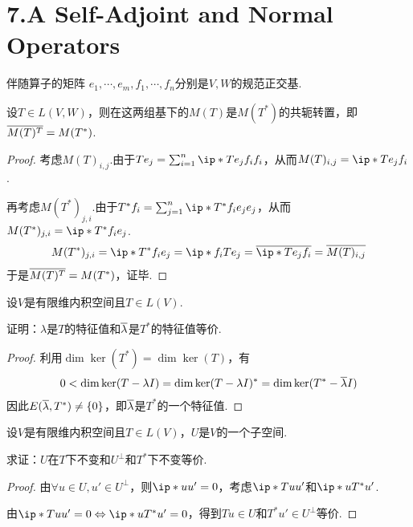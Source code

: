 \section{7.A Self-Adjoint and Normal Operators}

\begin{theorem}[7.10]\label{thm 7.10} 伴随算子的矩阵 \:
    \(e_1,\cdots,e_m,f_1,\cdots,f_n\)分别是\(V,W\)的规范正交基.

    设\(T \in L(V,W)\)，则在这两组基下的\(M(T)\)是\(M(T^*)\)的共轭转置，即\(\overline{M(T)^T}=M(T^*)\).
\end{theorem}

\begin{proof}
    考虑\(M(T)_{i,j}\).由于\(Te_j=\sum_{i=1}^n \ip*{Te_j}{f_i}f_i\)，从而\(M(T)_{i,j}=\ip*{Te_j}{f_i}\).

    再考虑\(M(T^*)_{j,i}\).由于\(T^*f_i=\sum_{j=1}^n \ip*{T^*f_i}{e_j}e_j\)，从而\(M(T^*)_{j,i}=\ip*{T^*f_i}{e_j}\).
    \begin{align*}
        M(T^*)_{j,i}=\ip*{T^*f_i}{e_j}=\ip*{f_i}{Te_j}=\ol{\ip*{Te_j}{f_i}}=\ol{M(T)_{i,j}}
    \end{align*}
    于是\(\overline{M(T)^T}=M(T^*)\)，证毕.
\end{proof}

\begin{problem}[2]\label{7.A.2}
    设\(V\)是有限维内积空间且\(T \in L(V)\).

    证明：\(\lambda\)是\(T\)的特征值和\(\overline{\lambda}\)是\(T^*\)的特征值等价.
\end{problem}

\begin{proof}
    利用\(\dim \ker(T^*)=\dim \ker(T)\)，有
    \begin{align*}
        0<\dim \ker(T-\lambda I)=\dim \ker(T-\lambda I)^*=\dim \ker(T^*-\overline{\lambda}I)
    \end{align*}
因此\(E(\overline{\lambda},T^*) \ne \{0\}\)，即\(\overline{\lambda}\)是\(T^*\)的一个特征值.
\end{proof}

\begin{problem}[3]\label{7.A.3}
    设\(V\)是有限维内积空间且\(T \in L(V)\)，\(U\)是\(V\)的一个子空间.

    求证：\(U\)在\(T\)下不变和\(U^\bot\)和\(T^*\)下不变等价.
\end{problem}

\begin{proof}
    由\(\forall u \in U,u' \in U^\bot\)，则\(\ip*{u}{u'}=0\)，考虑\(\ip*{Tu}{u'}\)和\(\ip*{u}{T^*u'}\).

    由\(\ip*{Tu}{u'}=0 \Leftrightarrow \ip*{u}{T^*u'}=0\)，得到\(Tu \in U\)和\(T^*u' \in U^\bot\)等价.
\end{proof}

